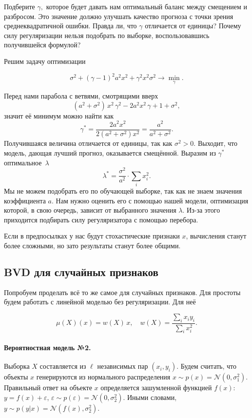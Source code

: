 \documentclass[12pt,fleqn]{article}
\begin{document}
\begin{vkProblem}
    Подберите $\gamma,$ которое будет давать нам оптимальный баланс между смещением и разбросом. Это значение должно улучшать качество прогноза с точки зрения среднеквадратичной ошибки. Правда ли, что $\gamma$ отличается от единицы? Почему силу регуляризации нельзя подобрать по выборке, воспользовавшись получившейся формулой?  
\end{vkProblem}
\begin{esSolution}
    Решим задачу оптимизации 
    
    \[
    \sigma^2 + (\gamma - 1)^2 a^2 x^2 + \gamma^2 x^2 \sigma^2 \to \min_{\gamma}.
    \]
    
    Перед нами парабола с ветвями, смотрящими вверх
    \[ 
    (a^2 + \sigma^2) \, x^2 \, \gamma^2 - 2a^2x^2 \, \gamma + 1 + \sigma^2,
    \]
    значит её минимум можно найти как
    \[
    \gamma^{*} = \frac{2a^2x^2}{2(a^2 + \sigma^2)x^2} = \frac{a^2}{a^2 + \sigma^2}. 
    \]
    Получившаяся величина отличается от единицы, так как $\sigma^2 > 0.$ Выходит, что модель, дающая лучший прогноз, оказывается смещённой. Выразим из $\gamma^{*}$ оптимальное~$\lambda$
    \[
    \lambda^{*} = \frac{\sigma^2}{a^2} \cdot \sum_i x_i^2.
    \]
    Мы не можем подобрать его по обучающей выборке, так как не знаем значения коэффициента $a$. Нам нужно оценить его с помощью нашей модели, оптимизация которой, в свою очередь, зависит от выбранного значения $\lambda.$ Из-за этого приходится подбирать силу регуляризатора с помощью перебора. 
\end{esSolution}

Если в предпосылках у нас будут стохастические признаки $x$, вычисления станут более сложными, но зато результаты станут более общими. 

\subsection{BVD для случайных признаков}

Попробуем проделать всё то же самое для случайных признаков. Для простоты будем работать с линейной моделью без регуляризации. Для неё 

\[
\mu(X)(x) = w(X) \,x, \quad w(X) = \frac{\sum_i x_i y_i}{\sum_i x_i^2}.
\]

\paragraph{Вероятностная модель №2.} Выборка $X$ составляется из $\ell$ независимых пар $(x_i, y_i)$. Будем считать, что объекты $x$ генерируются из нормального распределения $x \sim p(x) = \mathcal{N}(0, \sigma_1^2)$. Правильный ответ на объекте $x$ определяется зашумленной функцией $f(x)$: $y = f(x) + \varepsilon$, $\varepsilon \sim p(\varepsilon) = \mathcal{N}(0, \sigma_2^2)$. Иными словами, $y \sim p(y|x) = \mathcal{N}(f(x), \sigma_2^2)$.
\end{document}
